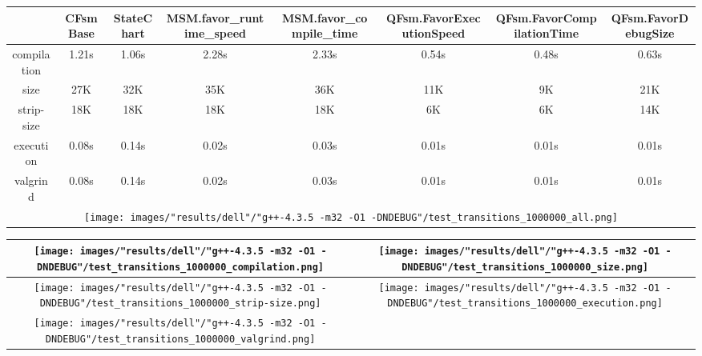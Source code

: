 \begin{landscape}
\begin{table}
\caption{"dell" [df6407d], g++-4.3.5 -m32 -O1 -DNDEBUG/test transitions 1000000}
\centering
\begin{longtable}{| c | c |c |c |c |c |c |c |}
\hline
& CFsmBase& StateChart& MSM.favor\_runtime\_speed& MSM.favor\_compile\_time& QFsm.FavorExecutionSpeed& QFsm.FavorCompilationTime& QFsm.FavorDebugSize\\
\hline
compilation & 1.21s & 1.06s & 2.28s & 2.33s & 0.54s & 0.48s & 0.63s\\
\hline
size & 27K & 32K & 35K & 36K & 11K & 9K & 21K\\
\hline
strip-size & 18K & 18K & 18K & 18K & 6K & 6K & 14K\\
\hline
execution & 0.08s & 0.14s & 0.02s & 0.03s & 0.01s & 0.01s & 0.01s\\
\hline
valgrind & 0.08s & 0.14s & 0.02s & 0.03s & 0.01s & 0.01s & 0.01s\\
\hline
\multicolumn{8}{|c|}{\texttt{[image: images/"results/dell"/"g++-4.3.5 -m32 -O1 -DNDEBUG"/test\_transitions\_1000000\_all.png]}}\\
\hline
\end{longtable}
\end{table}
\end{landscape}
\newpage
\begin{table}
\centering
\begin{longtable}{| c | c |}
\hline
\texttt{[image: images/"results/dell"/"g++-4.3.5 -m32 -O1 -DNDEBUG"/test\_transitions\_1000000\_compilation.png]}& \texttt{[image: images/"results/dell"/"g++-4.3.5 -m32 -O1 -DNDEBUG"/test\_transitions\_1000000\_size.png]}\\
\hline
\texttt{[image: images/"results/dell"/"g++-4.3.5 -m32 -O1 -DNDEBUG"/test\_transitions\_1000000\_strip-size.png]}& \texttt{[image: images/"results/dell"/"g++-4.3.5 -m32 -O1 -DNDEBUG"/test\_transitions\_1000000\_execution.png]}\\
\hline
\texttt{[image: images/"results/dell"/"g++-4.3.5 -m32 -O1 -DNDEBUG"/test\_transitions\_1000000\_valgrind.png]}& \\ \hline
\end{longtable}
\end{table}
